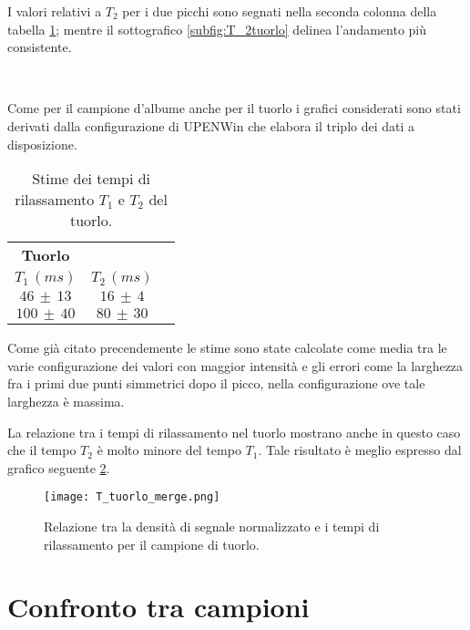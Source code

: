 I valori relativi a $T_2$ per i due picchi sono segnati nella seconda colonna della tabella \ref{tab:Tuorlo}; mentre il sottografico \ref{subfig:T_2tuorlo} delinea l'andamento più consistente.

\begin{figure}[ht]
\centering
{} \quad
{} \\
\caption{}
\label{fig:T_tuorlo}
\end{figure}

Come per il campione d'albume anche per il tuorlo i grafici considerati sono stati derivati dalla configurazione di UPENWin che elabora il triplo dei dati a disposizione.

\begin{table}[ht]
	\centering
	\begin{tabular}{ccc}
	\toprule
					\textbf{Tuorlo}	\\
		$T_1\,(ms)$ 		& 		$T_2\,(ms)$ 		\\	
	\midrule
		$46\,\pm\,13$		&		$16\,\pm\,4$		\\
		$100\,\pm\,40$		&		$80\,\pm\,30$		\\
	\bottomrule
	\end{tabular}
	\caption{Stime dei tempi di rilassamento $T_1$ e $T_2$ del tuorlo.}	
	\label{tab:Tuorlo}
\end{table}

Come già citato precendemente le stime sono state calcolate come media tra le varie configurazione dei valori con maggior intensità e gli errori come la larghezza fra i primi due punti simmetrici dopo il picco, nella configurazione ove tale larghezza è massima.

La relazione tra i tempi di rilassamento nel tuorlo mostrano anche in questo caso che il tempo $T_2$ è molto minore del tempo $T_1$. 
Tale risultato è meglio espresso dal grafico seguente \ref{fig:Tuorlo}.

\begin{figure}[ht]
\centering
\texttt{[image: T\_tuorlo\_merge.png]}
\caption{Relazione tra la densità di segnale normalizzato e i tempi di rilassamento per il campione di tuorlo.}
\label{fig:Tuorlo}
\end{figure}


\section*{Confronto tra campioni}

